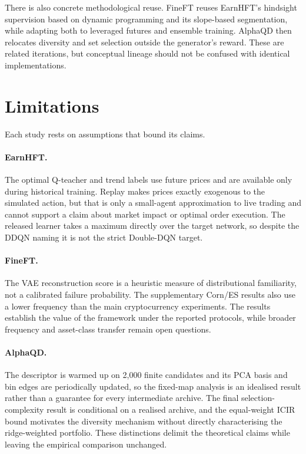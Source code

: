There is also concrete methodological reuse. FineFT reuses EarnHFT's hindsight supervision based on dynamic programming and its slope-based segmentation, while adapting both to leveraged futures and ensemble training. AlphaQD then relocates diversity and set selection outside the generator's reward. These are related iterations, but conceptual lineage should not be confused with identical implementations.

\section{Limitations}
\label{sec:concl_limitations}

Each study rests on assumptions that bound its claims.

\paragraph{EarnHFT.} The optimal Q-teacher and trend labels use future prices and are available only during historical training. Replay makes prices exactly exogenous to the simulated action, but that is only a small-agent approximation to live trading and cannot support a claim about market impact or optimal order execution. The released learner takes a maximum directly over the target network, so despite the DDQN naming it is not the strict Double-DQN target.

\paragraph{FineFT.} The VAE reconstruction score is a heuristic measure of distributional familiarity, not a calibrated failure probability. The supplementary Corn/ES results also use a lower frequency than the main cryptocurrency experiments. The results establish the value of the framework under the reported protocols, while broader frequency and asset-class transfer remain open questions.

\paragraph{AlphaQD.} The descriptor is warmed up on 2,000 finite candidates and its PCA basis and bin edges are periodically updated, so the fixed-map analysis is an idealised result rather than a guarantee for every intermediate archive. The final selection-complexity result is conditional on a realised archive, and the equal-weight ICIR bound motivates the diversity mechanism without directly characterising the ridge-weighted portfolio. These distinctions delimit the theoretical claims while leaving the empirical comparison unchanged.


